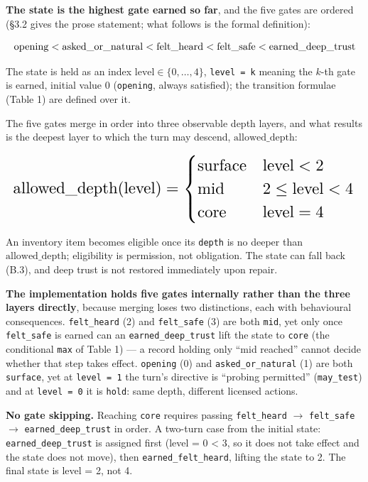 \documentclass[letterpaper]{article}
\begin{document}
\textbf{The state is the highest gate earned so far}, and the five gates are ordered (\S{}3.2 gives the prose statement; what follows is the formal definition):

\begin{equation*}
\resizebox{\columnwidth}{!}{$\displaystyle \text{opening} < \text{asked\_or\_natural} < \text{felt\_heard} < \text{felt\_safe} < \text{earned\_deep\_trust}$}
\end{equation*}

The state is held as an index $\text{level} \in \{0,\dots,4\}$, \texttt{level = k} meaning the $k$-th gate is earned, initial value 0 (\texttt{opening}, always satisfied); the transition formulae (Table 1) are defined over it.

The five gates merge in order into three observable depth layers, and what results is the deepest layer to which the turn may descend, $\text{allowed\_depth}$:

\begin{equation*}
\resizebox{\columnwidth}{!}{$\displaystyle \text{allowed\_depth}(\text{level}) = \begin{cases} \text{surface} & \text{level} < 2\\ \text{mid} & 2 \le \text{level} < 4\\ \text{core} & \text{level} = 4 \end{cases}$}
\end{equation*}

An inventory item becomes eligible once its \texttt{depth} is no deeper than $\text{allowed\_depth}$; eligibility is permission, not obligation. The state can fall back (B.3), and deep trust is not restored immediately upon repair.

\textbf{The implementation holds five gates internally rather than the three layers directly}, because merging loses two distinctions, each with behavioural consequences. \texttt{felt\_heard} (2) and \texttt{felt\_safe} (3) are both \texttt{mid}, yet only once \texttt{felt\_safe} is earned can an \texttt{earned\_deep\_trust} lift the state to \texttt{core} (the conditional \texttt{max} of Table 1) --- a record holding only ``mid reached'' cannot decide whether that step takes effect. \texttt{opening} (0) and \texttt{asked\_or\_natural} (1) are both \texttt{surface}, yet at \texttt{level = 1} the turn's directive is ``probing permitted'' (\texttt{may\_test}) and at \texttt{level = 0} it is \texttt{hold}: same depth, different licensed actions.

\textbf{No gate skipping.} Reaching \texttt{core} requires passing \texttt{felt\_heard} $\rightarrow$ \texttt{felt\_safe} $\rightarrow$ \texttt{earned\_deep\_trust} in order. A two-turn case from the initial state: \texttt{earned\_deep\_trust} is assigned first (level = 0 < 3, so it does not take effect and the state does not move), then \texttt{earned\_felt\_heard}, lifting the state to 2. The final state is level = 2, not 4.
\end{document}
